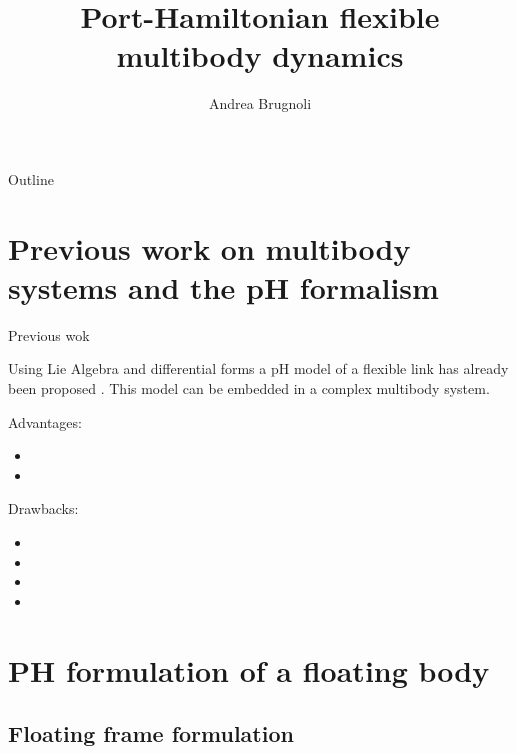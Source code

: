 \documentclass[aspectratio=169]{ISAE-Beamer}
\title[Virtual INFIDHEM meeting]{Port-Hamiltonian flexible multibody dynamics}
\institute[ISAE]
{\inst{1}ISAE-SUPAERO, Toulouse}
\author[Andrea Brugnoli]{Andrea Brugnoli}
\begin{document}
\maketitle

\begin{frame}{Outline}

\tableofcontents

\end{frame}

\section{Previous work on multibody systems and the pH formalism}

\begin{frame}{Previous wok}

Using Lie Algebra and differential forms a pH model of a flexible link has already been proposed . This model can be embedded in a complex multibody system. \\
\begin{overlayarea}{\textwidth}{0.55\textheight}
	\setlength{\abovedisplayskip}{1pt}
	\setlength{\belowdisplayskip}{1pt}
Advantages:
\begin{itemize}
	\item {}
	\item {}
\end{itemize}
Drawbacks:
\begin{itemize}
	\item {}
	\item {}
	\item {}
	\item {} 
\end{itemize}
\end{overlayarea}
\end{frame}

\section{PH formulation of a floating body}

\subsection{Floating frame formulation}
\end{document}
